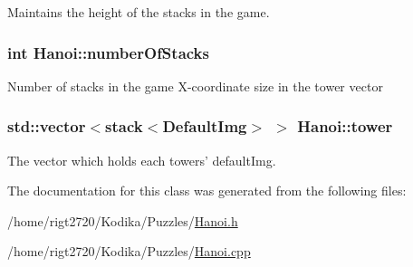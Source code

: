 Maintains the height of the stacks in the game. 

\hypertarget{classHanoi_abcdaa5a4b56f9c3916bf49e054e1cf8c}{
\subsubsection[{number\-Of\-Stacks}]{\setlength{\rightskip}{0pt plus 5cm}int Hanoi\-::number\-Of\-Stacks\hspace{0.3cm}{\ttfamily [private]}}}\label{classHanoi_abcdaa5a4b56f9c3916bf49e054e1cf8c}
Number of stacks in the game X-\/coordinate size in the tower vector \hypertarget{classHanoi_afe67c656c8ce8c7006e8b7f23fbe9ae9}{
\subsubsection[{tower}]{\setlength{\rightskip}{0pt plus 5cm}std\-::vector$<$stack$<${\bf Default\-Img}$>$ $>$ Hanoi\-::tower\hspace{0.3cm}{\ttfamily [private]}}}\label{classHanoi_afe67c656c8ce8c7006e8b7f23fbe9ae9}


The vector which holds each towers' default\-Img. 



The documentation for this class was generated from the following files\-:\begin{DoxyCompactItemize}
\item 
/home/rigt2720/\-Kodika/\-Puzzles/\hyperlink{Hanoi_8h}{Hanoi.\-h}\item 
/home/rigt2720/\-Kodika/\-Puzzles/\hyperlink{Hanoi_8cpp}{Hanoi.\-cpp}\end{DoxyCompactItemize}
